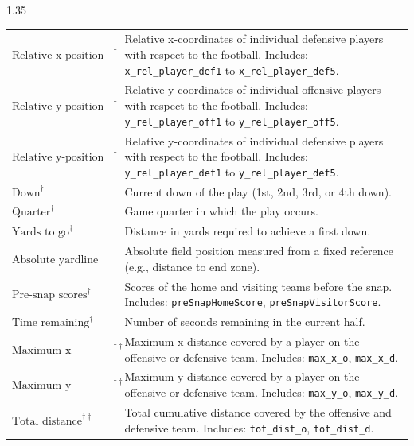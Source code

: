 \documentclass[12pt,a4paper]{article}
\begin{document}
\begin{spacing}{1.35}
\begin{table}[ht]
{\begin{tabular}{p{5cm} p{10cm}}
$\text{Relative x-position of defensive players}^{\dagger}$ &
Relative x-coordinates of individual defensive players with respect to the football.
Includes:
\texttt{x\_rel\_player\_def1} to \texttt{x\_rel\_player\_def5}. \\

$\text{Relative y-position of offensive players}^{\dagger}$ &
Relative y-coordinates of individual offensive players with respect to the football.
Includes:
\texttt{y\_rel\_player\_off1} to \texttt{y\_rel\_player\_off5}. \\

$\text{Relative y-position of defensive players}^{\dagger}$ &
Relative y-coordinates of individual defensive players with respect to the football.
Includes:
\texttt{y\_rel\_player\_def1} to \texttt{y\_rel\_player\_def5}. \\

$\text{Down}^{\dagger}$ &
Current down of the play (1st, 2nd, 3rd, or 4th down). \\

$\text{Quarter}^{\dagger}$ &
Game quarter in which the play occurs. \\

$\text{Yards to go}^{\dagger}$ &
Distance in yards required to achieve a first down. \\

$\text{Absolute yardline}^{\dagger}$ &
Absolute field position measured from a fixed reference (e.g., distance to end zone). \\

$\text{Pre-snap scores}^{\dagger}$ &
Scores of the home and visiting teams before the snap.
Includes:
\texttt{preSnapHomeScore},
\texttt{preSnapVisitorScore}. \\

$\text{Time remaining}^{\dagger}$ &
Number of seconds remaining in the current half. \\

\hline 

$\text{Maximum x distance}^{\dagger\dagger}$ &
Maximum x-distance covered by a player on the offensive or defensive team.
Includes:
\texttt{max\_x\_o},
\texttt{max\_x\_d}. \\

$\text{Maximum y distance}^{\dagger\dagger}$ &
Maximum y-distance covered by a player on the offensive or defensive team.
Includes:
\texttt{max\_y\_o},
\texttt{max\_y\_d}. \\

$\text{Total distance}^{\dagger\dagger}$ &
Total cumulative distance covered by the offensive and defensive team.
Includes:
\texttt{tot\_dist\_o},
\texttt{tot\_dist\_d}. \\


\end{tabular}}
\end{table}
\end{spacing}
\end{document}
